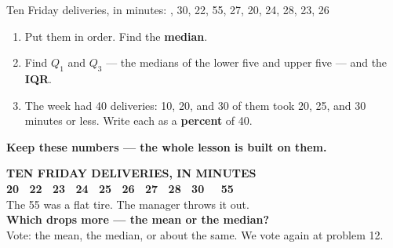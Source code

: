 \documentclass[aspectratio=169, 11pt]{beamer}
\begin{document}
\begin{frame}[t, plain]
  \vspace{0.2cm}
  \begin{center}
    \begin{minipage}{0.86\textwidth}
      Ten Friday deliveries, in minutes: , 30, 22, 55, 27, 20, 24, 28, 23, 26
      \begin{enumerate}\setlength{\itemsep}{6pt}
        \item Put them in order. Find the \textbf{median}.
        \item Find $Q_1$ and $Q_3$ --- the medians of the lower five and upper five --- and the
              \textbf{IQR}.
        \item The week had 40 deliveries: 10, 20, and 30 of them took 20, 25, and 30 minutes
              or less. Write each as a \textbf{percent} of 40.
      \end{enumerate}
    \end{minipage}
  \end{center}
  \vspace{0.3cm}
  \begin{center}
    {\color{cerulean}\bfseries Keep these numbers --- the whole lesson is built on them.}
  \end{center}
\end{frame}

{
\begin{frame}[plain]
  \vspace{1.1cm}
  \begin{center}
    {\color{frostmid}\bfseries\small TEN FRIDAY DELIVERIES, IN MINUTES}\\[0.5cm]
    {\color{white}\bfseries\large 20 \ 22 \ 23 \ 24 \ 25 \ 26 \ 27 \ 28 \ 30 \ \ {\color{goldacc}55}}\\[0.5cm]
    {\color{frostmid}\small The 55 was a flat tire. The manager throws it out.}\\[0.8cm]
    {\color{goldacc}\bfseries\Large Which drops more --- the mean or the median?}\\[0.5cm]
    {\color{frostmid}\small Vote: the mean, the median, or about the same. We vote again at problem 12.}
  \end{center}
\end{frame}
}
\end{document}

